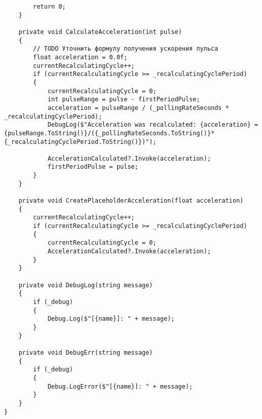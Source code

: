 \begin{verbatim}
        return 0;
    }

    private void CalculateAcceleration(int pulse)
    {
        // TODO Уточнить формулу получения ускорения пульса
        float acceleration = 0.0f;
        currentRecalculatingCycle++;
        if (currentRecalculatingCycle >= _recalculatingCyclePeriod)
        {
            currentRecalculatingCycle = 0;
            int pulseRange = pulse - firstPeriodPulse;
            acceleration = pulseRange / (_pollingRateSeconds * _recalculatingCyclePeriod);
            DebugLog($"Acceleration was recalculated: {acceleration} = {pulseRange.ToString()}/({_pollingRateSeconds.ToString()}*{_recalculatingCyclePeriod.ToString()})");

            AccelerationCalculated?.Invoke(acceleration);
            firstPeriodPulse = pulse;
        }
    }

    private void CreatePlaceholderAcceleration(float acceleration)
    {
        currentRecalculatingCycle++;
        if (currentRecalculatingCycle >= _recalculatingCyclePeriod)
        {
            currentRecalculatingCycle = 0;
            AccelerationCalculated?.Invoke(acceleration);
        }
    }

    private void DebugLog(string message)
    {
        if (_debug)
        {
            Debug.Log($"[{name}]: " + message);
        }
    }
    
    private void DebugErr(string message)
    {
        if (_debug)
        {
            Debug.LogError($"[{name}]: " + message);
        }
    }
}
\end{verbatim}
